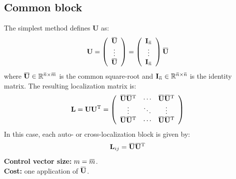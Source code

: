 \documentclass[12pt]{scrartcl}
\newcommand{\overbar}[1]{\mkern 1.5mu\overline{\mkern-1.5mu#1\mkern-1.5mu}\mkern 1.5mu}
\begin{document}
\subsection{Common block}
The simplest method defines $\mathbf{U}$ as:
\begin{align}
\mathbf{U} = \left( \begin{array}{c}
\overbar{\mathbf{U}} \\
\vdots \\
\overbar{\mathbf{U}}
\end{array} \right) = \left( \begin{array}{c}
\mathbf{I}_{\overbar{n}} \\
\vdots \\
\mathbf{I}_{\overbar{n}} \\
\end{array} \right) \overbar{\mathbf{U}}
\end{align}
where $\overbar{\mathbf{U}} \in \mathbb{R}^{\overbar{n} \times \overbar{m}}$ is the common square-root and $\mathbf{I}_{\overbar{n}} \in \mathbb{R}^{\overbar{n} \times \overbar{n}}$ is the identity matrix. The resulting localization matrix is:
\begin{align}
\mathbf{L} = \mathbf{U} \mathbf{U}^\mathrm{T} = \left( \begin{array}{ccc}
\overbar{\mathbf{U}} \overbar{\mathbf{U}}^\mathrm{T} & \cdots & \overbar{\mathbf{U}} \overbar{\mathbf{U}}^\mathrm{T} \\
\vdots & \ddots & \vdots  \\
\overbar{\mathbf{U}} \overbar{\mathbf{U}}^\mathrm{T} & \cdots & \overbar{\mathbf{U}} \overbar{\mathbf{U}}^\mathrm{T}
\end{array} \right)
\end{align}
In this case, each auto- or cross-localization block is given by: 
\begin{align}
\mathbf{L}_{ij} = \overbar{\mathbf{U}} \overbar{\mathbf{U}}^\mathrm{T}
\end{align}
\textbf{Control vector size:} $\displaystyle m = \overbar{m}$.\\
\textbf{Cost:} one application of $\overbar{\mathbf{U}}$.
\end{document}
